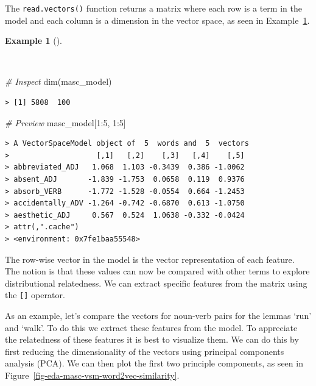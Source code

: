 \documentclass[
  letterpaper,
]{latex/krantz}
\newenvironment{Shaded}{\begin{snugshade}}{\end{snugshade}}
\newcommand{\CommentTok}[1]{\textcolor[rgb]{0.00,0.00,0.00}{\textit{#1}}}
\newcommand{\DecValTok}[1]{\textcolor[rgb]{0.00,0.00,0.00}{#1}}
\newcommand{\FunctionTok}[1]{\textcolor[rgb]{0.00,0.00,0.00}{#1}}
\newcommand{\NormalTok}[1]{\textcolor[rgb]{0.00,0.00,0.00}{#1}}
\newcommand{\SpecialCharTok}[1]{\textcolor[rgb]{0.00,0.00,0.00}{#1}}
\theoremstyle{definition}
\newtheorem{example}{Example}[chapter]
\theoremstyle{remark}
\begin{document}
The \texttt{read.vectors()} function returns a matrix where each row is
a term in the model and each column is a dimension in the vector space,
as seen in Example~\ref{exm-eda-masc-vsm-word2vec-vector-object}.

\begin{example}[]\protect\hypertarget{exm-eda-masc-vsm-word2vec-vector-object}{}\label{exm-eda-masc-vsm-word2vec-vector-object}

~

\begin{Shaded}
\begin{Highlighting}[]
\CommentTok{\# Inspect}
\FunctionTok{dim}\NormalTok{(masc\_model)}
\end{Highlighting}
\end{Shaded}

\begin{verbatim}
> [1] 5808  100
\end{verbatim}

\begin{Shaded}
\begin{Highlighting}[]
\CommentTok{\# Preview}
\NormalTok{masc\_model[}\DecValTok{1}\SpecialCharTok{:}\DecValTok{5}\NormalTok{, }\DecValTok{1}\SpecialCharTok{:}\DecValTok{5}\NormalTok{]}
\end{Highlighting}
\end{Shaded}

\begin{verbatim}
> A VectorSpaceModel object of  5  words and  5  vectors
>                    [,1]   [,2]    [,3]   [,4]    [,5]
> abbreviated_ADJ   1.068  1.103 -0.3439  0.386 -1.0062
> absent_ADJ       -1.839 -1.753  0.0658  0.119  0.9376
> absorb_VERB      -1.772 -1.528 -0.0554  0.664 -1.2453
> accidentally_ADV -1.264 -0.742 -0.6870  0.613 -1.0750
> aesthetic_ADJ     0.567  0.524  1.0638 -0.332 -0.0424
> attr(,".cache")
> <environment: 0x7fe1baa55548>
\end{verbatim}

\end{example}

The row-wise vector in the model is the vector representation of each
feature. The notion is that these values can now be compared with other
terms to explore distributional relatedness. We can extract specific
features from the matrix using the \texttt{{[}{]}} operator.

As an example, let's compare the vectors for noun-verb pairs for the
lemmas `run' and `walk'. To do this we extract these features from the
model. To appreciate the relatedness of these features it is best to
visualize them. We can do this by first reducing the dimensionality of
the vectors using principal components analysis (PCA). We can then plot
the first two principle components, as seen in
Figure~\ref{fig-eda-masc-vsm-word2vec-similarity}.
\end{document}
